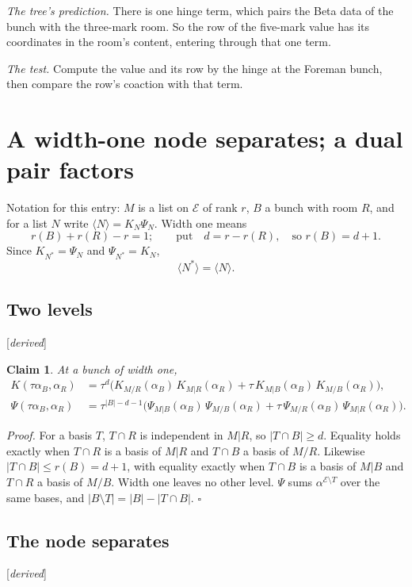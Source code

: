 \documentclass[11pt]{article}
\newcommand{\cE}{\mathcal E}
\newcommand{\status}[1]{\hfill{\small[\textit{#1}]}}
\theoremstyle{plain}
\newtheorem{claim}{Claim}[section]
\theoremstyle{remark}
\begin{document}
\emph{The tree's prediction.} There is one hinge term, which pairs the Beta data of the bunch with the three-mark room. So the row of the five-mark value has its coordinates in the room's content, entering through that one term.

\emph{The test.} Compute the value and its row by the hinge at the Foreman bunch, then compare the row's coaction with that term.

\section{A width-one node separates; a dual pair factors}

Notation for this entry: $M$ is a list on $\cE$ of rank $r$, $B$ a bunch with room $R$, and for a list $N$ write $\langle N\rangle=K_N\Psi_N$. Width one means
\[
r(B)+r(R)-r=1;\qquad\text{put}\quad d=r-r(R),\quad\text{so } r(B)=d+1 .
\]
Since $K_{N^\ast}=\Psi_N$ and $\Psi_{N^\ast}=K_N$,
\[
\langle N^\ast\rangle=\langle N\rangle .
\]

\subsection{Two levels}\status{derived}

\begin{claim}\label{cl:twolevels}
At a bunch of width one,
\begin{align*}
K(\tau\alpha_B,\alpha_R)&=\tau^{d}\big(K_{M/R}(\alpha_B)\,K_{M|R}(\alpha_R)+\tau\,K_{M|B}(\alpha_B)\,K_{M/B}(\alpha_R)\big),\\
\Psi(\tau\alpha_B,\alpha_R)&=\tau^{|B|-d-1}\big(\Psi_{M|B}(\alpha_B)\,\Psi_{M/B}(\alpha_R)+\tau\,\Psi_{M/R}(\alpha_B)\,\Psi_{M|R}(\alpha_R)\big).
\end{align*}
\end{claim}

\emph{Proof.} For a basis $T$, $T\cap R$ is independent in $M|R$, so $|T\cap B|\ge d$. Equality holds exactly when $T\cap R$ is a basis of $M|R$ and $T\cap B$ a basis of $M/R$. Likewise $|T\cap B|\le r(B)=d+1$, with equality exactly when $T\cap B$ is a basis of $M|B$ and $T\cap R$ a basis of $M/B$. Width one leaves no other level. $\Psi$ sums $\alpha^{\cE\setminus T}$ over the same bases, and $|B\setminus T|=|B|-|T\cap B|$. $\square$

\subsection{The node separates}\status{derived}
\end{document}
